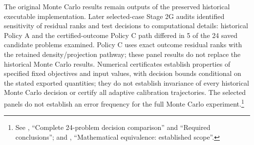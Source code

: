 The original Monte Carlo results remain outputs of the preserved historical executable implementation. Later selected-case Stage 2G audits identified sensitivity of residual ranks and test decisions to computational details: historical Policy A and the certified-outcome Policy C path differed in 5 of the 24 saved candidate problems examined. Policy C uses exact outcome residual ranks with the retained density/projection pathway; these panel results do not replace the historical Monte Carlo results. Numerical certificates establish properties of specified fixed objectives and input values, with decision bounds conditional on the stated exported quantities; they do not establish invariance of every historical Monte Carlo decision or certify all adaptive calibration trajectories. The selected panels do not establish an error frequency for the full Monte Carlo experiment.\footnote{See , ``Complete 24-problem decision comparison'' and ``Required conclusions''; and , ``Mathematical equivalence: established scope''.}



